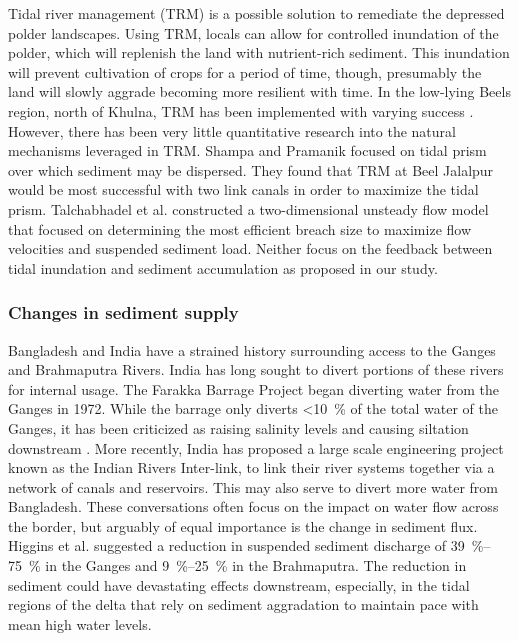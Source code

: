 \documentclass{wscpaperproc}
\theoremstyle{wsc}
\begin{document}
Tidal river management (TRM) is a possible solution to remediate the depressed polder landscapes. Using TRM, locals can allow for controlled inundation of the polder, which will replenish the land with nutrient-rich sediment. This inundation will prevent cultivation of crops for a period of time, though, presumably the land will slowly aggrade becoming more resilient with time. In the low-lying Beels region, north of Khulna, TRM has been implemented with varying success \cite{khadimIntegratedWaterResources2013a,shampaTidalRiverManagement2012,vanstaverenBringingTidesClosing2017}. However, there has been very little quantitative research into the natural mechanisms leveraged in TRM. Shampa and Pramanik \cite{shampaTidalRiverManagement2012} focused on tidal prism over which sediment may be dispersed. They found that TRM at Beel Jalalpur would be most successful with two link canals in order to maximize the tidal prism. Talchabhadel et al. \cite{talchabhadelExperimentalStudyTidal2017} constructed a two-dimensional unsteady flow model that focused on determining the most efficient breach size to maximize flow velocities and suspended sediment load. Neither focus on the feedback between tidal inundation and sediment accumulation as proposed in our study.

\subsubsection{Changes in sediment supply}

Bangladesh and India have a strained history surrounding access to the Ganges and Brahmaputra Rivers. India has long sought to divert portions of these rivers for internal usage. The Farakka Barrage Project began diverting water from the Ganges in 1972. While the barrage only diverts \SI{<10}{\percent} of the total water of the Ganges, it has been criticized as raising salinity levels and causing siltation downstream \cite{gainImpactFarakkaDam2014}. More recently, India has proposed a large scale engineering project known as the Indian Rivers Inter-link, to link their river systems together via a network of canals and reservoirs. This may also serve to divert more water from Bangladesh. These conversations often focus on the impact on water flow across the border, but arguably of equal importance is the change in sediment flux. Higgins et al. \cite{higginsRiverLinkingIndia2018}  suggested a reduction in suspended sediment discharge of \SIrange{39}{75}{\percent} in the Ganges and \SIrange{9}{25}{\percent} in the Brahmaputra. The reduction in sediment could have devastating effects downstream, especially, in the tidal regions of the delta that rely on sediment aggradation to maintain pace with mean high water levels.
\end{document}
